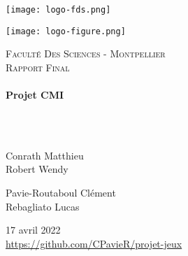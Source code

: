 \documentclass[a4paper, 12pt]{article}
\begin{document}
\begin{titlepage}
  \begin{sffamily}
  \begin{center}
  

\begin{minipage}[c]{.46\linewidth}
     \begin{center}
             \texttt{[image: logo-fds.png]}
         \end{center}
   \end{minipage} \hfill
   \begin{minipage}[c]{.46\linewidth}
    \begin{center}
            \texttt{[image: logo-figure.png]}
        \end{center}
 \end{minipage}
    \newline \newline

    \textsc{\LARGE Faculté Des Sciences - Montpellier}\\[2cm]

    \textsc{\Large Rapport Final}\\[1.5cm]

    \HRule \\[0.4cm]
    { \huge \bfseries Projet CMI\\[0.4cm] }

    \HRule \\[2cm]
    \\[2cm]

    \begin{minipage}{0.4\textwidth}
      \begin{flushleft} \large
        Conrath Matthieu\\
        Robert Wendy\\
      \end{flushleft}
    \end{minipage}
    \begin{minipage}{0.4\textwidth}
      \begin{flushright} \large
       Pavie-Routaboul Clément\\
        Rebagliato Lucas\\
      \end{flushright}
    \end{minipage}

    \vfill
    {\large 17 avril 2022}
    \\
    {\url{https://github.com/CPavieR/projet-jeux}}

  \end{center}
  \end{sffamily}
\end{titlepage}
\end{document}
